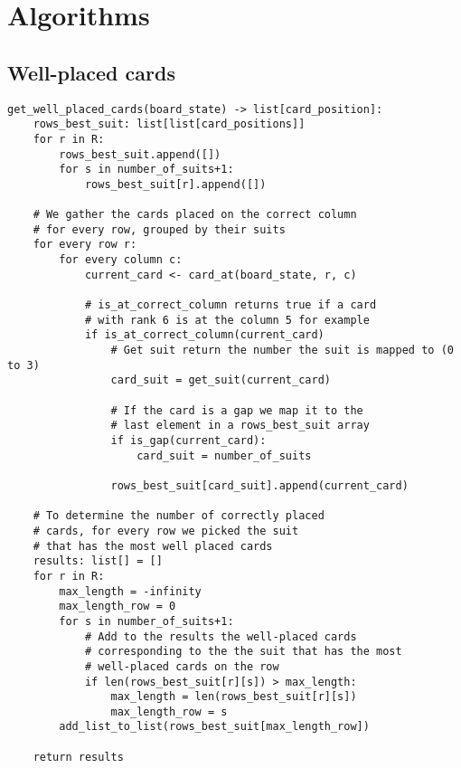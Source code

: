 \chapter{Algorithms}
\section{Well-placed cards} \label{appendix:algo}
\begin{lstlisting}
get_well_placed_cards(board_state) -> list[card_position]:
    rows_best_suit: list[list[card_positions]]
    for r in R:
        rows_best_suit.append([])
        for s in number_of_suits+1:
            rows_best_suit[r].append([])

    # We gather the cards placed on the correct column
    # for every row, grouped by their suits
    for every row r:
        for every column c:
            current_card <- card_at(board_state, r, c)

            # is_at_correct_column returns true if a card 
            # with rank 6 is at the column 5 for example
            if is_at_correct_column(current_card)
                # Get suit return the number the suit is mapped to (0 to 3)
                card_suit = get_suit(current_card)

                # If the card is a gap we map it to the 
                # last element in a rows_best_suit array
                if is_gap(current_card):
                    card_suit = number_of_suits
                    
                rows_best_suit[card_suit].append(current_card)

    # To determine the number of correctly placed
    # cards, for every row we picked the suit
    # that has the most well placed cards
    results: list[] = []
    for r in R:
        max_length = -infinity
        max_length_row = 0
        for s in number_of_suits+1:
            # Add to the results the well-placed cards
            # corresponding to the the suit that has the most
            # well-placed cards on the row
            if len(rows_best_suit[r][s]) > max_length:
                max_length = len(rows_best_suit[r][s])
                max_length_row = s
        add_list_to_list(rows_best_suit[max_length_row])

    return results
\end{lstlisting}
